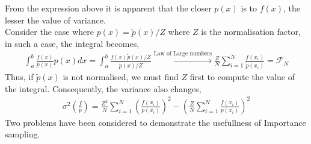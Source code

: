 \documentclass[a4paper,12pt]{article}
\begin{document}
    From the expression above it is apparent that the closer $p(x)$ is to $f(x)$, the lesser the value of variance.\\
    Consider the case where $p(x)=\tilde{p}(x)/Z$ where $Z$ is the normalisation factor, in such a case, the integral becomes,
    \begin{gather}
        \int_a^b \frac{f(x)}{p(x)}p(x) dx =\int_a^b \frac{f(x)\tilde{p}(x)/Z}{\tilde{p}(x)/Z}\stackrel{\text{Law of Large numbers}}{\longrightarrow} \frac{Z}{N}\sum_{i=1}^N\frac{f(x_i)}{\tilde{p}(x_i)}=\mathcal{F}_N
    \end{gather}
    Thus, if $\tilde{p}(x)$ is not normalised, we must find $Z$ first to compute the value of the integral. Consequently, the variance also changes,
    \begin{gather}
        \sigma^2\left(\frac{f}{p}\right)=\frac{Z^2}{N}\sum_{i=1}^N \left(\frac{f(x_i)}{p(x_i)}\right)^2-\left(\frac{Z}{N}\sum_{i=1}^N\frac{f(x_i)}{p(x_i)}\right)^2
    \end{gather}
    Two problems have been considered to demonstrate the usefullness of Importance sampling.
\end{document}
